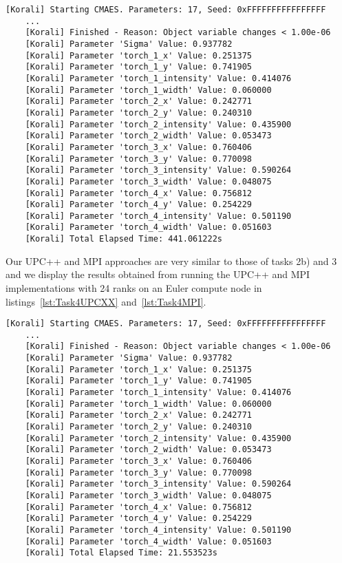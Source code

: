 \documentclass[11pt]{article}
\begin{document}
    \begin{lstlisting}[basicstyle=\tiny, frame=single, caption={Korali
    output for the single conduit when running the code from Task 1 with
    population size 23.}, label={lst:Task4Single}]
    [Korali] Starting CMAES. Parameters: 17, Seed: 0xFFFFFFFFFFFFFFFF
    ...
    [Korali] Finished - Reason: Object variable changes < 1.00e-06
    [Korali] Parameter 'Sigma' Value: 0.937782
    [Korali] Parameter 'torch_1_x' Value: 0.251375
    [Korali] Parameter 'torch_1_y' Value: 0.741905
    [Korali] Parameter 'torch_1_intensity' Value: 0.414076
    [Korali] Parameter 'torch_1_width' Value: 0.060000
    [Korali] Parameter 'torch_2_x' Value: 0.242771
    [Korali] Parameter 'torch_2_y' Value: 0.240310
    [Korali] Parameter 'torch_2_intensity' Value: 0.435900
    [Korali] Parameter 'torch_2_width' Value: 0.053473
    [Korali] Parameter 'torch_3_x' Value: 0.760406
    [Korali] Parameter 'torch_3_y' Value: 0.770098
    [Korali] Parameter 'torch_3_intensity' Value: 0.590264
    [Korali] Parameter 'torch_3_width' Value: 0.048075
    [Korali] Parameter 'torch_4_x' Value: 0.756812
    [Korali] Parameter 'torch_4_y' Value: 0.254229
    [Korali] Parameter 'torch_4_intensity' Value: 0.501190
    [Korali] Parameter 'torch_4_width' Value: 0.051603
    [Korali] Total Elapsed Time: 441.061222s
    \end{lstlisting}

    Our UPC++ and MPI approaches are very similar to those of tasks 2b) and
    3 and we display the results obtained from running the UPC++ and MPI
    implementations with 24 ranks on an Euler compute node in
    listings~\ref{lst:Task4UPCXX} and~\ref{lst:Task4MPI}.

    \begin{lstlisting}[basicstyle=\tiny, frame=single, caption={Korali
    output for the UPC++ conduit when running the code from Task 1 with
    population size 23.}, label={lst:Task4UPCXX}]
    [Korali] Starting CMAES. Parameters: 17, Seed: 0xFFFFFFFFFFFFFFFF
    ...
    [Korali] Finished - Reason: Object variable changes < 1.00e-06
    [Korali] Parameter 'Sigma' Value: 0.937782
    [Korali] Parameter 'torch_1_x' Value: 0.251375
    [Korali] Parameter 'torch_1_y' Value: 0.741905
    [Korali] Parameter 'torch_1_intensity' Value: 0.414076
    [Korali] Parameter 'torch_1_width' Value: 0.060000
    [Korali] Parameter 'torch_2_x' Value: 0.242771
    [Korali] Parameter 'torch_2_y' Value: 0.240310
    [Korali] Parameter 'torch_2_intensity' Value: 0.435900
    [Korali] Parameter 'torch_2_width' Value: 0.053473
    [Korali] Parameter 'torch_3_x' Value: 0.760406
    [Korali] Parameter 'torch_3_y' Value: 0.770098
    [Korali] Parameter 'torch_3_intensity' Value: 0.590264
    [Korali] Parameter 'torch_3_width' Value: 0.048075
    [Korali] Parameter 'torch_4_x' Value: 0.756812
    [Korali] Parameter 'torch_4_y' Value: 0.254229
    [Korali] Parameter 'torch_4_intensity' Value: 0.501190
    [Korali] Parameter 'torch_4_width' Value: 0.051603
    [Korali] Total Elapsed Time: 21.553523s
    \end{lstlisting}
\end{document}
